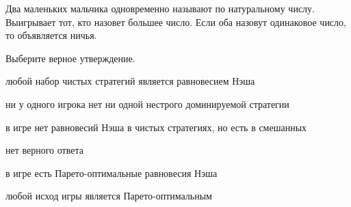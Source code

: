 
\begin{question}
Два маленьких мальчика одновременно называют по натуральному числу.
Выигрывает тот, кто назовет большее число.
Если оба назовут одинаковое число, то объявляется ничья.

Выберите верное утверждение.
\begin{answerlist}
  \item любой набор чистых стратегий является равновесием Нэша
  \item ни у одного игрока нет ни одной нестрого доминируемой стратегии
  \item в игре нет равновесий Нэша в чистых стратегиях, но есть в смешанных
  \item нет верного ответа
  \item в игре есть Парето-оптимальные равновесия Нэша
  \item любой исход игры является Парето-оптимальным
\end{answerlist}
\end{question}


